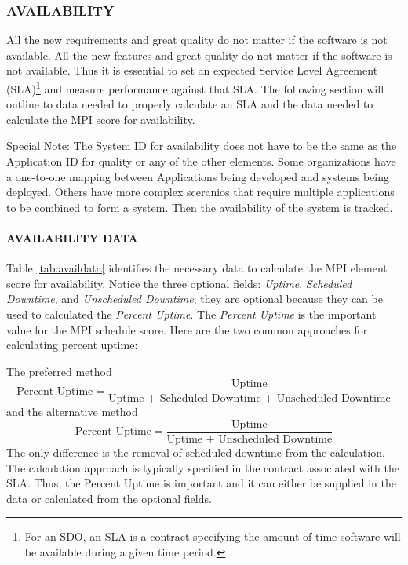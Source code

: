 \documentclass[SDSUThesis.tex]{subfiles}
\begin{document}
        \subsubsection{AVAILABILITY}
            All the new requirements and great quality do not matter if the software is not available.
            All the new features and great quality do not matter if the software is not available.  Thus it
            is essential to set an expected Service Level Agreement (SLA)\footnote{For an SDO, an SLA is a 
            contract specifying the amount of time software will be available during a
            given time period. } and measure 
            performance against that SLA.  The following section will outline to data needed to properly
            calculate an SLA and the data needed to calculate the MPI score for availability.
            
            Special Note: The System ID for availability does not have to be the same
            as the Application ID for quality or any of the other elements.  Some 
            organizations have a one-to-one mapping between Applications being developed
            and systems being deployed.  Others have more complex sceranios that require
            multiple applications to be combined to form a system.  Then the availability
            of the system is tracked.
            
            \paragraph{AVAILABILITY DATA}
                Table \ref{tab:availdata} identifies the necessary data to calculate
                the MPI element score for availability.  Notice the three optional 
                fields: \textit{Uptime}, \textit{Scheduled Downtime}, and 
                \textit{Unscheduled Downtime}; they are optional because they can be
                used to calculated the \textit{Percent Uptime}.  The \textit{Percent Uptime}
                is the important value for the MPI schedule score.  Here are the two common
                approaches for calculating percent uptime:
                
                The preferred method
                \[
                    \text{Percent Uptime} = \frac{\text{Uptime}}{\text{Uptime + Scheduled Downtime + Unscheduled Downtime}}
                \]
                and the alternative method
                \[
                    \text{Percent Uptime} = \frac{\text{Uptime}}{\text{Uptime + Unscheduled Downtime}}
                \]
                The only difference is the removal of scheduled downtime from 
                the calculation.  The calculation approach is typically specified in
                the contract associated with the SLA.  Thus, the Percent Uptime is important
                and it can either be supplied in the data or calculated from the 
                optional fields.
            
\end{document}

